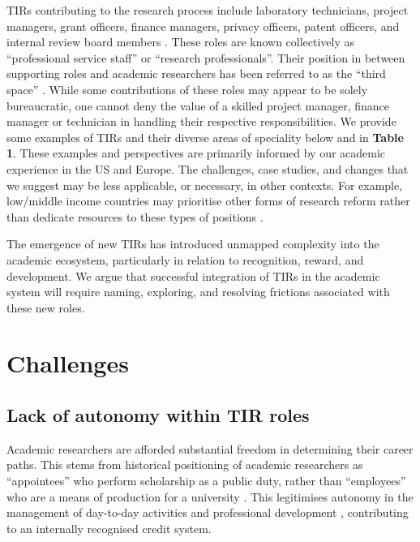 \documentclass[authordate,meta,issue]{jote-new-article}
\begin{document}
TIRs contributing to the research process include laboratory technicians, project managers, grant officers, finance managers, privacy officers, patent officers, and internal review board members \parencites{Heffner1979}{UKRI2023}. These roles are known collectively as “professional service staff” or “research professionals”. Their position in between supporting roles and academic researchers has been referred to as the “third space” \parencites{Whitchurch2008}. While some contributions of these roles may appear to be solely bureaucratic, one cannot deny the value of a skilled project manager, finance manager or technician in handling their respective responsibilities. We provide some examples of TIRs and their diverse areas of speciality below and in \textbf{Table 1}. These examples and perspectives are primarily informed by our academic experience in the US and Europe. The challenges, case studies, and changes that we suggest may be less applicable, or necessary, in other contexts. For example, low/middle income countries may prioritise other forms of research reform rather than dedicate resources to these types of positions \parencites{Bezuidenhout2018}{Bezuidenhout2017}{Onie2020}.







The emergence of new TIRs has introduced unmapped complexity into the academic ecosystem, particularly in relation to recognition, reward, and development. We argue that successful integration of TIRs in the academic system will require naming, exploring, and resolving frictions associated with these new roles.



\section{Challenges}



\subsection{Lack of autonomy within TIR roles}



Academic researchers are afforded substantial freedom in determining their career paths. This stems from historical positioning of academic researchers as “appointees” who perform scholarship as a public duty, rather than “employees” who are a means of production for a university \parencites{Finkin2011}. This legitimises autonomy in the management of day-to-day activities and professional development \parencites{Wolf2021}, contributing to an internally recognised credit system.
\end{document}

